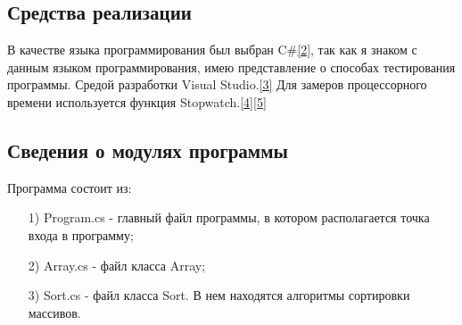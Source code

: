 \documentclass[14pt, a4paper]{extarticle}
\begin{document}
\subsection{Средства реализации}
В качестве языка программирования был выбран C\#\hyperref[literature]{[2]}, так как я знаком с данным языком программирования, имею представление о способах тестирования программы.
\noindent Средой разработки Visual Studio.\hyperref[literature]{[3]}
\noindent Для замеров процессорного времени используется функция Stopwatch.\hyperref[literature]{[4]}\hyperref[literature]{[5]}

\subsection{Сведения о модулях программы}
Программа состоит из:
\begin{enumerate}
	\item[1)] Program.cs - главный файл программы, в котором располагается точка входа в программу;
	\item[2)] Array.cs - файл класса Array;
	\item[3)] Sort.cs - файл класса Sort. В нем находятся алгоритмы сортировки массивов.
\end{enumerate}
\end{document}
